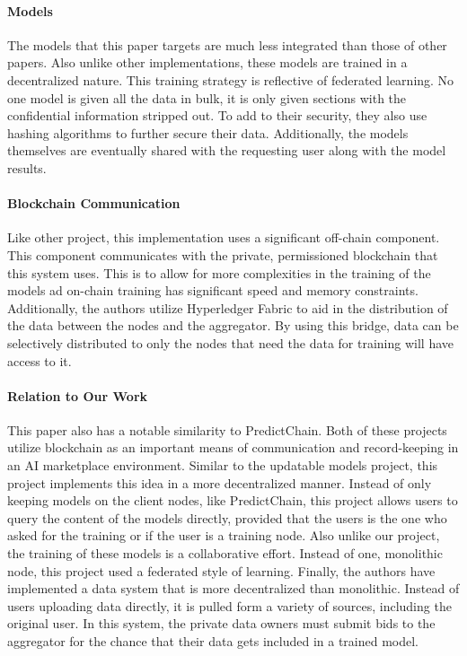 \documentclass{article}
\begin{document}
    \paragraph{Models}
    The models that this paper targets are much less integrated than those of other papers.  Also unlike other implementations,
    these models are trained in a decentralized nature.  This training strategy is reflective of federated learning.  No
    one model is given all the data in bulk, it is only given sections with the confidential information stripped out.
    To add to their security, they also use hashing algorithms to further secure their data.  Additionally, the models
    themselves are eventually shared with the requesting user along with the model results.

    \paragraph{Blockchain Communication}
    Like other project, this implementation uses a significant off-chain component.  This component communicates
    with the private, permissioned blockchain that this system uses.  This is to allow for more complexities
    in the training of the models ad on-chain training has significant speed and memory constraints.  Additionally,
    the authors utilize Hyperledger Fabric to aid in the distribution of the data between the nodes and the aggregator.
    By using this bridge, data can be selectively distributed to only the nodes that need the data for training will
    have access to it.

    \paragraph{Relation to Our Work}
    This paper also has a notable similarity to PredictChain.  Both of these projects utilize blockchain as an important
    means of communication and record-keeping in an AI marketplace environment.  Similar to the updatable models
    project, this project implements this idea in a more decentralized manner.  Instead of only keeping models on the
    client nodes, like PredictChain, this project allows users to query the content of the models directly, provided that
    the users is the one who asked for the training or if the user is a training node.  Also unlike our project,
    the training of these models is a collaborative effort.  Instead of one, monolithic node, this project used
    a federated style of learning.  Finally, the authors have implemented a data system that is more decentralized than
    monolithic.  Instead of users uploading data directly, it is pulled form a variety of sources, including the original
    user.  In this system, the private data owners must submit bids to the aggregator for the chance that their data
    gets included in a trained model.
\end{document}
